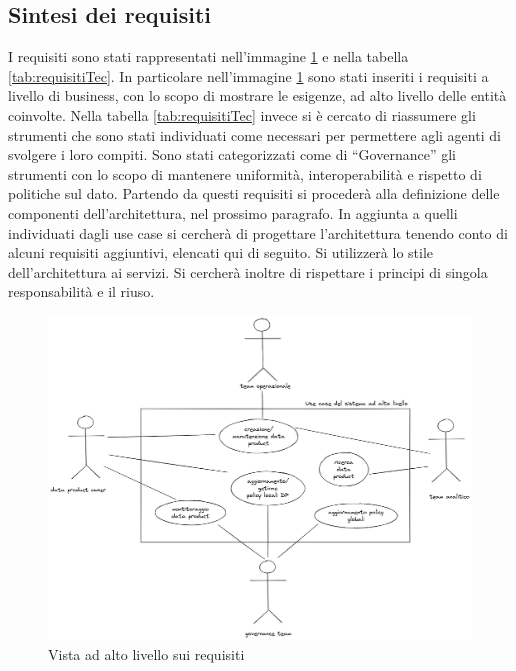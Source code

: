 \documentclass[12pt]{report}
\begin{document}
\subsection{Sintesi dei requisiti}
I requisiti sono stati rappresentati nell'immagine \ref{fig:requisitiBusiness} e nella tabella \ref{tab:requisitiTec}. 
In particolare nell'immagine \ref{fig:requisitiBusiness} sono stati inseriti i requisiti a livello di business, con lo scopo di mostrare le esigenze, ad alto livello delle entità coinvolte.
Nella tabella \ref{tab:requisitiTec} invece si è cercato di riassumere gli strumenti che sono stati individuati come necessari per permettere agli agenti di svolgere i loro compiti.
Sono stati categorizzati come di ``Governance'' gli strumenti con lo scopo di mantenere uniformità, interoperabilità e rispetto di politiche sul dato. 
Partendo da questi requisiti si procederà alla definizione delle componenti dell'architettura, nel prossimo paragrafo.
In aggiunta a quelli individuati dagli use case si cercherà di progettare l'architettura tenendo conto di alcuni requisiti aggiuntivi, elencati qui di seguito.
Si utilizzerà lo stile dell'architettura ai servizi.
Si cercherà inoltre di rispettare i principi di singola responsabilità e il riuso.

\begin{figure}
        \centering
        \includegraphics[width=0.75\linewidth]{immagini/business use cases data mesh SOA 2023-07-06 10.49.16.excalidraw.png}
        \caption{Vista ad alto livello sui requisiti}
        \label{fig:requisitiBusiness}
    \end{figure}
\end{document}
